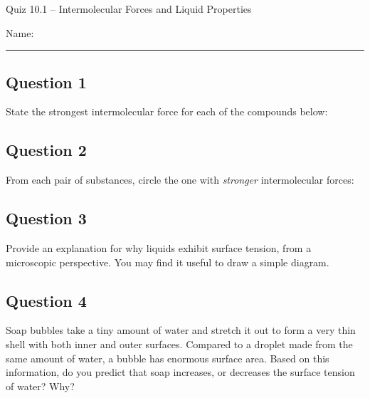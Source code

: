 \documentclass[11pt, letterpaper]{memoir}
\begin{document}
	\begin{center}
		{\large	Quiz 10.1 -- Intermolecular Forces and Liquid Properties}
	\end{center}
	{\large Name: \rule[-1mm]{4in}{.1pt} 
	\subsection*{Question 1}
	State the strongest intermolecular force for each of the compounds below:
	
	
	\vspace{3em}
	\subsection*{Question 2}
	From each pair of substances, circle the one with \emph{stronger} intermolecular forces:
	
	
	\vspace{1em}
	\subsection*{Question 3}
	Provide an explanation for why liquids exhibit surface tension, from a microscopic perspective. You may find it useful to draw a simple diagram.
	
	\vspace{6em}
	\subsection*{Question 4}
	Soap bubbles take a tiny amount of water and stretch it out to form a very thin shell with both inner and outer surfaces. Compared to a droplet made from the same amount of water, a bubble has enormous surface area. Based on this information, do you predict that soap increases, or decreases the surface tension of water? Why?
	
	\vspace{4em}
}
\end{document}
